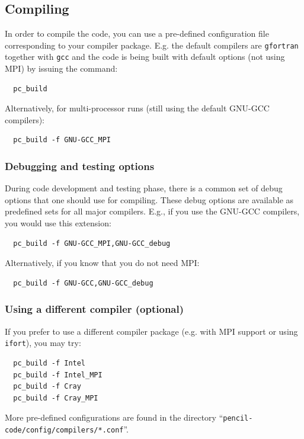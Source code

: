 \documentclass[a4paper,12pt]{article}
\newcommand{\command}[1]{\texttt{#1}}
\newcommand{\file}[1]{``\texttt{#1}''}
\newcommand{\name}[1]{\textsc{#1}}
\begin{document}
\subsection{Compiling}

In order to compile the code, you can use a pre-defined configuration file corresponding to your compiler package.
E.g. the default compilers are \command{gfortran} together with \command{gcc} and the code is being built with default options (not using \name{MPI}) by issuing the command:

\begin{verbatim}
  pc_build
\end{verbatim}

Alternatively, for multi-processor runs (still using the default \name{GNU-GCC} compilers):
\begin{verbatim}
  pc_build -f GNU-GCC_MPI
\end{verbatim}


\subsubsection{Debugging and testing options}

During code development and testing phase, there is a common set of debug options that one should use for compiling.
These debug options are available as predefined sets for all major compilers.
E.g., if you use the \name{GNU-GCC} compilers, you would use this extension:
\begin{verbatim}
  pc_build -f GNU-GCC_MPI,GNU-GCC_debug
\end{verbatim}
Alternatively, if you know that you do not need MPI:
\begin{verbatim}
  pc_build -f GNU-GCC,GNU-GCC_debug
\end{verbatim}

\subsubsection{Using a different compiler (optional)}

If you prefer to use a different compiler package (e.g. with \name{MPI} support or using \command{ifort}), you may try:

\begin{verbatim}
  pc_build -f Intel
  pc_build -f Intel_MPI
  pc_build -f Cray
  pc_build -f Cray_MPI
\end{verbatim}

More pre-defined configurations are found in the directory \file{pencil-code/config/compilers/*.conf}.
\end{document}
